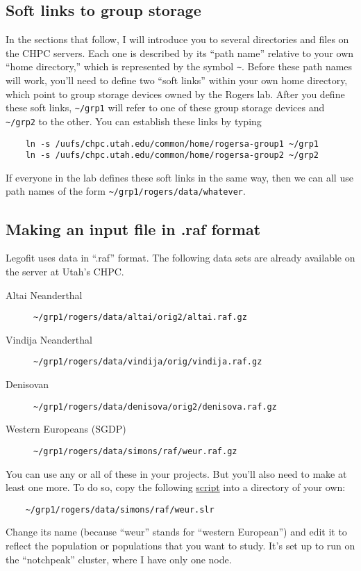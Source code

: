 \documentclass[11pt]{article}
\begin{document}
\subsection{Soft links to group storage}
In the sections that follow, I will introduce you to several
directories and files on the CHPC servers. Each one is described by
its ``path name'' relative to your own ``home directory,'' which is
represented by the symbol \verb|~|. Before these path names will work,
you'll need to define two ``soft links'' within your own home
directory, which point to group storage devices owned by the Rogers
lab. After you define these soft links, \verb|~/grp1| will refer to
one of these group storage devices and \verb|~/grp2| to the other. You
can establish these links by typing
\begin{verbatim}
    ln -s /uufs/chpc.utah.edu/common/home/rogersa-group1 ~/grp1
    ln -s /uufs/chpc.utah.edu/common/home/rogersa-group2 ~/grp2
\end{verbatim}
If everyone in the lab defines these soft links in the same way, then
we can all use path names of the form
\verb|~/grp1/rogers/data/whatever|.

\subsection{Making an input file in .raf format}
Legofit uses data in ``.raf'' format. The following data sets are
already available on the server at Utah's CHPC.
\begin{description}
\item[Altai Neanderthal]
\verb|~/grp1/rogers/data/altai/orig2/altai.raf.gz|

\item[Vindija Neanderthal]
\verb|~/grp1/rogers/data/vindija/orig/vindija.raf.gz|

\item[Denisovan]
\verb|~/grp1/rogers/data/denisova/orig2/denisova.raf.gz|

\item[Western Europeans (SGDP)]
\verb|~/grp1/rogers/data/simons/raf/weur.raf.gz|
\end{description}
You can use any or all of these in your projects. But you'll also need
to make at least one more. To do so, copy the following
\href{https://alanrogers.github.io/agar22/legofit/weur.slr.html}{script}
into a directory of your own:
\begin{verbatim}
    ~/grp1/rogers/data/simons/raf/weur.slr
\end{verbatim}
Change its name (because ``weur'' stands for ``western European'') and
edit it to reflect the population or populations that you want to
study. It's set up to run on the ``notchpeak'' cluster, where I have
only one node.
\end{document}
